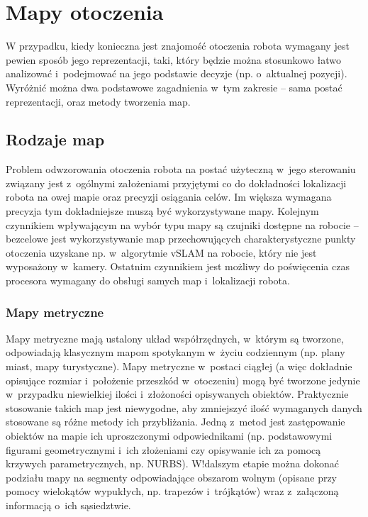 \section{Mapy otoczenia}

W przypadku, kiedy konieczna jest znajomość otoczenia robota wymagany jest pewien
sposób jego reprezentacji, taki, który będzie można stosunkowo łatwo analizować
i~podejmować na jego podstawie decyzje (np. o~aktualnej pozycji). Wyróżnić
można dwa podstawowe zagadnienia w~tym zakresie -- sama postać reprezentacji,
oraz metody tworzenia map.

\subsection{Rodzaje map}

Problem odwzorowania otoczenia robota na postać użyteczną w~jego sterowaniu
związany jest z~ogólnymi założeniami przyjętymi co do dokładności lokalizacji robota
na owej mapie oraz precyzji osiągania celów. Im większa wymagana precyzja
tym dokładniejsze muszą być wykorzystywane mapy. Kolejnym czynnikiem wpływającym
na wybór typu mapy są czujniki dostępne na robocie -- bezcelowe jest wykorzystywanie
map przechowujących charakterystyczne punkty otoczenia uzyskane np. w~algorytmie
vSLAM na robocie, który nie jest wyposażony w~kamery. Ostatnim czynnikiem
jest możliwy do poświęcenia czas procesora wymagany do obsługi samych map
i~lokalizacji robota.

\subsubsection{Mapy metryczne}

Mapy metryczne mają ustalony układ współrzędnych, w~którym są tworzone, odpowiadają
klasycznym mapom spotykanym w~życiu codziennym (np. plany miast, mapy turystyczne).
Mapy metryczne w~postaci ciągłej (a więc dokładnie opisujące rozmiar i~położenie
przeszkód w~otoczeniu) mogą być tworzone jedynie w~przypadku niewielkiej ilości
i~złożoności opisywanych obiektów. Praktycznie stosowanie takich map jest niewygodne,
aby zmniejszyć ilość wymaganych danych stosowane są różne metody ich przybliżania.
Jedną z~metod jest zastępowanie obiektów na mapie ich uproszczonymi odpowiednikami
(np. podstawowymi figurami geometrycznymi i~ich złożeniami czy opisywanie ich za pomocą
krzywych parametrycznych, np. NURBS). W!dalszym etapie można dokonać podziału mapy
na segmenty odpowiadające obszarom wolnym (opisane przy pomocy wielokątów wypukłych,
np. trapezów i~trójkątów) wraz z~załączoną informacją o~ich sąsiedztwie.

